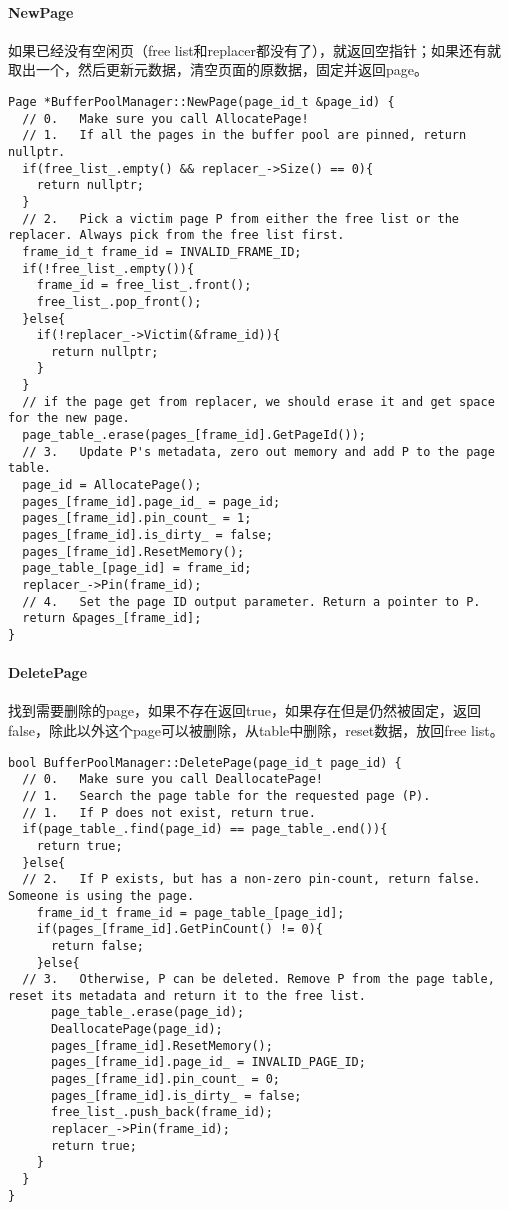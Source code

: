 \documentclass[12pt,hyperref,a4paper,UTF8]{ctexart}
\begin{document}
\paragraph{NewPage}
如果已经没有空闲页（free list和replacer都没有了），就返回空指针；如果还有就取出一个，然后更新元数据，清空页面的原数据，固定并返回page。
\begin{verbatim}
Page *BufferPoolManager::NewPage(page_id_t &page_id) {
  // 0.   Make sure you call AllocatePage!
  // 1.   If all the pages in the buffer pool are pinned, return nullptr.
  if(free_list_.empty() && replacer_->Size() == 0){
    return nullptr;
  }
  // 2.   Pick a victim page P from either the free list or the replacer. Always pick from the free list first.
  frame_id_t frame_id = INVALID_FRAME_ID;
  if(!free_list_.empty()){
    frame_id = free_list_.front();
    free_list_.pop_front();
  }else{
    if(!replacer_->Victim(&frame_id)){
      return nullptr;
    }
  }
  // if the page get from replacer, we should erase it and get space for the new page.
  page_table_.erase(pages_[frame_id].GetPageId());
  // 3.   Update P's metadata, zero out memory and add P to the page table.
  page_id = AllocatePage();
  pages_[frame_id].page_id_ = page_id;
  pages_[frame_id].pin_count_ = 1;
  pages_[frame_id].is_dirty_ = false;
  pages_[frame_id].ResetMemory();
  page_table_[page_id] = frame_id;
  replacer_->Pin(frame_id);
  // 4.   Set the page ID output parameter. Return a pointer to P.
  return &pages_[frame_id];
}
\end{verbatim}

\paragraph{DeletePage}
找到需要删除的page，如果不存在返回true，如果存在但是仍然被固定，返回false，除此以外这个page可以被删除，从table中删除，reset数据，放回free list。
\begin{verbatim}
bool BufferPoolManager::DeletePage(page_id_t page_id) {
  // 0.   Make sure you call DeallocatePage!
  // 1.   Search the page table for the requested page (P).
  // 1.   If P does not exist, return true.
  if(page_table_.find(page_id) == page_table_.end()){
    return true;
  }else{
  // 2.   If P exists, but has a non-zero pin-count, return false. Someone is using the page.
    frame_id_t frame_id = page_table_[page_id];
    if(pages_[frame_id].GetPinCount() != 0){
      return false;
    }else{
  // 3.   Otherwise, P can be deleted. Remove P from the page table, reset its metadata and return it to the free list.
      page_table_.erase(page_id);
      DeallocatePage(page_id);
      pages_[frame_id].ResetMemory();
      pages_[frame_id].page_id_ = INVALID_PAGE_ID;
      pages_[frame_id].pin_count_ = 0;
      pages_[frame_id].is_dirty_ = false;
      free_list_.push_back(frame_id);
      replacer_->Pin(frame_id);
      return true;
    }
  }
}
\end{verbatim}
\end{document}
